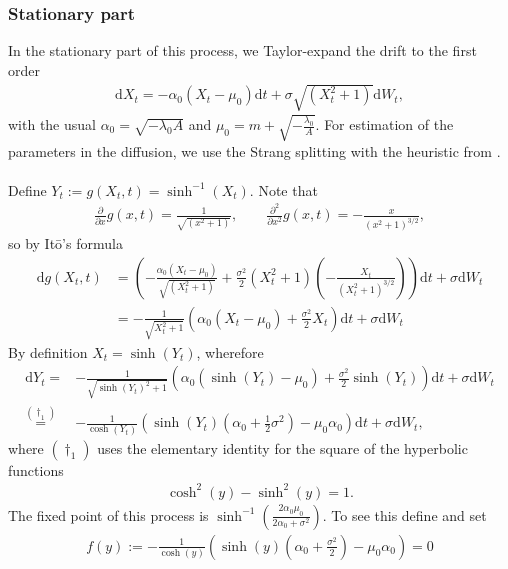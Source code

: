 \subsubsection{Stationary part}
In the stationary part of this process, we Taylor-expand the drift to the first order
\begin{align}
    \mathrm{d}X_t = -\alpha_0\left(X_t - \mu_0\right)\mathrm{d}t + \sigma \sqrt{\left(X_t^2 + 1\right)}\mathrm{d}W_t,
\end{align}
with the usual $\alpha_0 = \sqrt{-\lambda_0 A}$ and $\mu_0 = m + \sqrt{-\frac{\lambda_0}{A}}$.
For estimation of the parameters in the diffusion, we use the Strang splitting with the heuristic from \cite{SplittingSchemes}.\\\\
Define $Y_t := g(X_t , t) = \sinh^{-1}(X_t)$. Note that 
\begin{align}
    \frac{\partial}{\partial x}g(x, t) = \frac{1}{\sqrt{(x^2 + 1)}}, \qquad \frac{\partial^2}{\partial x^2}g(x, t) = -\frac{x}{\left(x^2 + 1\right)^{3/2}},
\end{align}
so by Itō's formula
\begin{align}
    \mathrm{d}g(X_t , t) &= \left(-\frac{\alpha_0\left(X_t - \mu_0\right)}{\sqrt{(X_t^2 + 1)}}+\frac{\sigma^2}{2}\left(X_t^2 + 1\right)\left(-\frac{X_t}{\left(X_t^2 + 1\right)^{3/2}}\right)\right)\mathrm{d}t + \sigma\mathrm{d}W_t\nonumber \\
    &= -\frac{1}{\sqrt{X_t^2 + 1}}\left(\alpha_0\left(X_t - \mu_0\right) + \frac{\sigma^2}{2}X_t\right)\mathrm{d}t + \sigma\mathrm{d}W_t
\end{align}
By definition $X_t = \sinh(Y_t)$, wherefore
\begin{align}
    \mathrm{d}Y_t =& -\frac{1}{\sqrt{\sinh(Y_t)^2 + 1}}\left(\alpha_0\left(\sinh(Y_t)- \mu_0\right) + \frac{\sigma^2}{2}\sinh(Y_t)\right)\mathrm{d}t + \sigma\mathrm{d}W_t \nonumber \\
    \overset{(\dagger_1)}{=}&- \frac{1}{\cosh(Y_t)}\left(\sinh(Y_t)\left(\alpha_0 + \frac{1}{2}\sigma^2\right) - \mu_0\alpha_0\right)\mathrm{d}t + \sigma \mathrm{d}W_t,
\end{align}
where $(\dagger_1)$ uses the elementary identity for the square of the hyperbolic functions
\begin{align*}
    \cosh^2(y) - \sinh^2(y) = 1.
\end{align*} 
The fixed point of this process is $\sinh^{-1}(\frac{2\alpha_0\mu_0}{2\alpha_0 + \sigma^2})$. To see this define and set
\begin{align}
    f(y) := -\frac{1}{\cosh(y)}\left(\sinh(y)\left(\alpha_0 + \frac{\sigma^2}{2}\right) - \mu_0\alpha_0\right) = 0
\end{align}
